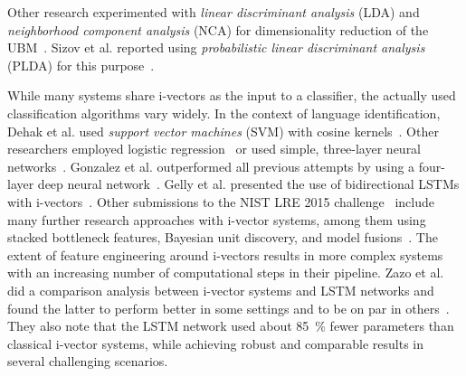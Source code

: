 Other research experimented with \emph{linear discriminant analysis} (LDA) and \emph{neighborhood component analysis} (NCA) for dimensionality reduction of the UBM~\cite{dehak2011front}. Sizov et al. reported using \emph{probabilistic linear discriminant analysis} (PLDA) for this purpose~\cite{sizov2016discriminating}.

While many systems share i-vectors as the input to a classifier, the actually used classification algorithms vary widely. In the context of language identification, Dehak et al. used \emph{support vector machines} (SVM) with cosine kernels~\cite{dehak2011front}. Other researchers employed logistic regression~\cite{martinez2011language} or used simple, three-layer neural networks~\cite{plchot2016bat}. Gonzalez et al. outperformed all previous attempts by using a four-layer deep neural network~\cite{gonzalez2015frame}. Gelly et al. presented the use of bidirectional LSTMs with i-vectors~\cite{gelly2016language}. Other submissions to the NIST LRE 2015 challenge~\cite{lre2015} include many further research approaches with i-vector systems, among them using stacked bottleneck features, Bayesian unit discovery, and model fusions~\cite{lee20162015, torres2008mitll, ng2016sheffield}. The extent of feature engineering around i-vectors results in more complex systems with an increasing number of computational steps in their pipeline. Zazo et al. did a comparison analysis between i-vector systems and LSTM networks and found the latter to perform better in some settings and to be on par in others~\cite{zazo2016evaluation}. They also note that the LSTM network used about \SI{85}{\percent} fewer parameters than classical i-vector systems, while achieving robust and comparable results in several challenging scenarios.

